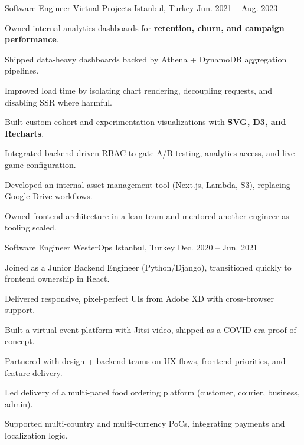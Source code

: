 \begin{cventries}
\vspace{2mm}
\cventry
  {Software Engineer}
  {Virtual Projects}
  {Istanbul, Turkey}
  {Jun. 2021 -- Aug. 2023}
  {
    \begin{cvitems}
      \item {Owned internal analytics dashboards for \textbf{retention, churn, and campaign performance}.}
      \item {Shipped data-heavy dashboards backed by Athena + DynamoDB aggregation pipelines.}
      \item {Improved load time by isolating chart rendering, decoupling requests, and disabling SSR where harmful.}
      \item {Built custom cohort and experimentation visualizations with \textbf{SVG, D3, and Recharts}.}
      \item {Integrated backend-driven RBAC to gate A/B testing, analytics access, and live game configuration.}
      \item {Developed an internal asset management tool (Next.js, Lambda, S3), replacing Google Drive workflows.}
      \item {Owned frontend architecture in a lean team and mentored another engineer as tooling scaled.}
    \end{cvitems}
  }

\vspace{2mm}
\cventry
  {Software Engineer}
  {WesterOps}
  {Istanbul, Turkey}
  {Dec. 2020 -- Jun. 2021}
  {
    \begin{cvitems}
      \item {Joined as a Junior Backend Engineer (Python/Django), transitioned quickly to frontend ownership in React.}
      \item {Delivered responsive, pixel-perfect UIs from Adobe XD with cross-browser support.}
      \item {Built a virtual event platform with Jitsi video, shipped as a COVID-era proof of concept.}
      \item {Partnered with design + backend teams on UX flows, frontend priorities, and feature delivery.}
      \item {Led delivery of a multi-panel food ordering platform (customer, courier, business, admin).}
      \item {Supported multi-country and multi-currency PoCs, integrating payments and localization logic.}
    \end{cvitems}
  }

\end{cventries}
